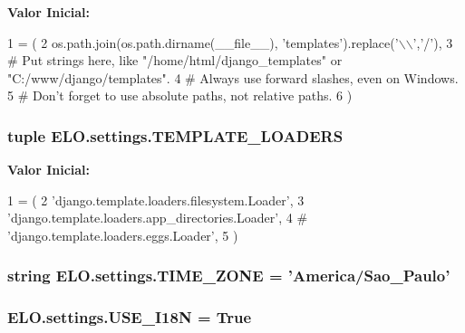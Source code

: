 {\bfseries Valor Inicial\-:}
\begin{DoxyCode}
1 = (
2     os.path.join(os.path.dirname(\_\_file\_\_), \textcolor{stringliteral}{'templates'}).replace(\textcolor{stringliteral}{'\(\backslash\)\(\backslash\)'},\textcolor{stringliteral}{'/'}),
3     \textcolor{comment}{# Put strings here, like "/home/html/django\_templates" or "C:/www/django/templates".}
4     \textcolor{comment}{# Always use forward slashes, even on Windows.}
5     \textcolor{comment}{# Don't forget to use absolute paths, not relative paths.}
6 )
\end{DoxyCode}
\hypertarget{namespaceELO_1_1settings_a9c876284f3865d5a15a73bedccfe3bb7}{
\subsubsection[{T\-E\-M\-P\-L\-A\-T\-E\-\_\-\-L\-O\-A\-D\-E\-R\-S}]{\setlength{\rightskip}{0pt plus 5cm}tuple E\-L\-O.\-settings.\-T\-E\-M\-P\-L\-A\-T\-E\-\_\-\-L\-O\-A\-D\-E\-R\-S}}\label{namespaceELO_1_1settings_a9c876284f3865d5a15a73bedccfe3bb7}
{\bfseries Valor Inicial\-:}
\begin{DoxyCode}
1 = (
2     \textcolor{stringliteral}{'django.template.loaders.filesystem.Loader'},
3     \textcolor{stringliteral}{'django.template.loaders.app\_directories.Loader'},
4 \textcolor{comment}{#     'django.template.loaders.eggs.Loader',}
5 )
\end{DoxyCode}
\hypertarget{namespaceELO_1_1settings_aafd318ffa70db1890eaf1f8621e19d53}{
\subsubsection[{T\-I\-M\-E\-\_\-\-Z\-O\-N\-E}]{\setlength{\rightskip}{0pt plus 5cm}string E\-L\-O.\-settings.\-T\-I\-M\-E\-\_\-\-Z\-O\-N\-E = 'America/Sao\-\_\-\-Paulo'}}\label{namespaceELO_1_1settings_aafd318ffa70db1890eaf1f8621e19d53}
\hypertarget{namespaceELO_1_1settings_a2d03ced1be44b9d7937bdbc870474ffe}{
\subsubsection[{U\-S\-E\-\_\-\-I18\-N}]{\setlength{\rightskip}{0pt plus 5cm}E\-L\-O.\-settings.\-U\-S\-E\-\_\-\-I18\-N = True}}\label{namespaceELO_1_1settings_a2d03ced1be44b9d7937bdbc870474ffe}
